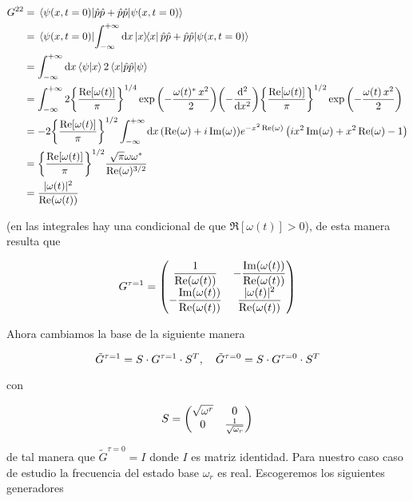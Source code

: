 \documentclass[../Main.tex]{subfiles}
\begin{document}
\begin{equation}
\begin{split}
G^{22} & =\ev{\hat{p}\hat{p}+\hat{p}\hat{p}}{\psi(x,t=0)} \\
& =\ev{\int_{-\infty}^{+\infty}\dd{x}\op{x}{x}\hat{p}\hat{p}+\hat{p}\hat{p}}{\psi(x,t=0)} \\
& =\int_{-\infty}^{+\infty}\dd{x}\ip{\psi}{x}2\mel{x}{\hat{p}\hat{p}}{\psi} \\
& =\int_{-\infty}^{+\infty}2\Bqty{\dfrac{\Re[\omega (t)]}{\pi}}^{1/4}\exp \pqty{- \frac{\omega(t)^{*} \, x^2}{2}}\pqty{-\dv[2]{x}}\Bqty{\dfrac{\Re[\omega (t)]}{\pi}}^{1/2}\exp \pqty{- \frac{\omega(t) \, x^2}{2}} \\
& =-2\Bqty{\dfrac{\Re[\omega (t)]}{\pi}}^{1/2}\int_{-\infty}^{+\infty}\dd{x}(\Re(\omega)+i \Im(\omega)) e^{-x^2 \Re(\omega)} \left(i x^2 \Im(\omega)+x^2 \Re(\omega)-1\right) \\
& =\Bqty{\dfrac{\Re[\omega (t)]}{\pi}}^{1/2}\frac{\sqrt{\pi } \omega  \omega^*}{ \Re(\omega)^{3/2}} \\
& =\dfrac{|\omega(t) |^2}{\text {Re}  (\omega(t))}
\end{split}
\end{equation}

(en las integrales hay una condicional de que $\Re[\omega(t)]>0$), de esta manera resulta que

\begin{equation}
G^{\tau=1}=\mqty(\dfrac{1}{ \text {Re}  (\omega(t))} & -\dfrac{\text {Im}  (\omega(t))}{\text {Re}  (\omega(t))} \\ -\dfrac{ \text {Im}  (\omega(t))}{\text {Re}  (\omega(t))} & \dfrac{|\omega(t) |^2}{\text {Re}  (\omega(t))})
\end{equation}

Ahora cambiamos la base de la siguiente manera

\begin{equation}
\tilde G^{\tau=1}= S\cdot G^{\tau=1}\cdot S^{T}\qc\tilde G^{\tau=0}= S\cdot G^{\tau=0}\cdot S^{T} 
\end{equation}

con

\begin{equation}
S=\pmqty{\sqrt{\omega^r} & 0\\ 0& \frac{1}{\sqrt{\omega_r}}}
\end{equation}

de tal manera que  $\tilde G^{\tau=0}= I $ donde $ I$ es matriz identidad. Para nuestro caso caso de estudio la frecuencia del estado base $\omega_r$ es real. Escogeremos los siguientes generadores
\end{document}
